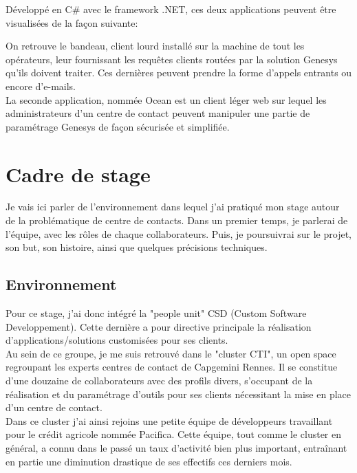 \documentclass{rapport}
\begin{document}
Développé en C\# avec le framework .NET, ces deux applications peuvent être visualisées de la façon suivante:


On retrouve le bandeau, client lourd installé sur la machine de tout les opérateurs, leur fournissant les requêtes clients routées par la solution Genesys qu'ils doivent traiter. Ces dernières peuvent prendre la forme d'appels entrants ou encore d'e-mails.\\

La seconde application, nommée Ocean est un client léger web sur lequel les administrateurs d'un centre de contact peuvent manipuler une partie de paramétrage Genesys de façon sécurisée et simplifiée.

\newpage

\section{Cadre de stage}

Je vais ici parler de l'environnement dans lequel j'ai pratiqué mon stage autour de la problématique de centre de contacts.
Dans un premier temps, je parlerai de l'équipe, avec les rôles de chaque collaborateurs. Puis, je poursuivrai sur le projet, son but, son histoire, ainsi que quelques précisions techniques.

\subsection{Environnement}

Pour ce stage, j'ai donc intégré la "people unit" CSD (Custom Software Developpement). Cette dernière a pour directive principale la réalisation d'applications/solutions customisées pour ses clients.\\

Au sein de ce groupe, je me suis retrouvé dans le "cluster CTI", un open space regroupant les experts centres de contact de Capgemini Rennes. Il se constitue d'une douzaine de collaborateurs avec des profils divers, s'occupant de la réalisation et du paramétrage d'outils pour ses clients nécessitant la mise en place d'un centre de contact.\\

Dans ce cluster j'ai ainsi rejoins une petite équipe de développeurs travaillant pour le crédit agricole nommée Pacifica. Cette équipe, tout comme le cluster en général, a connu dans le passé un taux d'activité bien plus important, entraînant en partie une diminution drastique de ses effectifs ces derniers mois.
\end{document}
